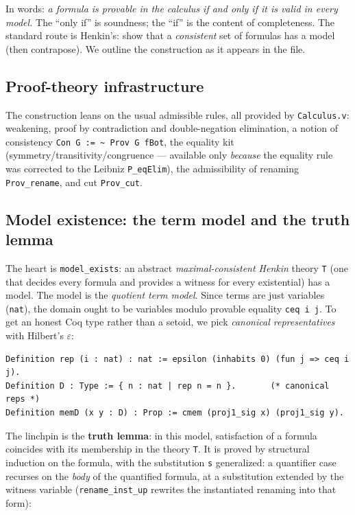 \documentclass[11pt]{article}
\theoremstyle{plain}
\theoremstyle{definition}
\newcommand{\cq}[1]{\lstinline[basicstyle=\ttfamily]|#1|}
\begin{document}
In words: \emph{a formula is provable in the calculus if and only if it is valid in
every model.} The ``only if'' is soundness; the ``if'' is the content of
completeness. The standard route is Henkin's: show that a \emph{consistent} set of
formulas has a model (then contrapose). We outline the construction as it appears
in the file.

\subsection{Proof-theory infrastructure}

The construction leans on the usual admissible rules, all provided by
\texttt{Calculus.v}: weakening, proof by contradiction and double-negation
elimination, a notion of
consistency \cq{Con G := ~ Prov G fBot}, the equality kit
(symmetry/transitivity/congruence --- available
only \emph{because} the equality rule was corrected to the Leibniz \cq{P_eqElim}),
the admissibility of renaming \cq{Prov_rename}, and cut \cq{Prov_cut}.

\subsection{Model existence: the term model and the truth lemma}

The heart is \cq{model_exists}: an abstract \emph{maximal-consistent Henkin}
theory \cq{T} (one that decides every formula and provides a witness for every
existential) has a model. The model is the \emph{quotient term model}. Since terms
are just variables (\cq{nat}), the domain ought to be variables modulo provable
equality \cq{ceq i j}. To get an honest Coq type rather than a setoid, we pick
\emph{canonical representatives} with Hilbert's $\varepsilon$:

\begin{lstlisting}
Definition rep (i : nat) : nat := epsilon (inhabits 0) (fun j => ceq i j).
Definition D : Type := { n : nat | rep n = n }.       (* canonical reps *)
Definition memD (x y : D) : Prop := cmem (proj1_sig x) (proj1_sig y).
\end{lstlisting}

The linchpin is the \textbf{truth lemma}: in this model, satisfaction of a formula
coincides with its membership in the theory \cq{T}. It is proved by structural
induction on the formula, with the substitution \cq{s} generalized: a quantifier
case recurses on the \emph{body} of the quantified formula, at a substitution
extended by the witness variable (\cq{rename_inst_up} rewrites the instantiated
renaming into that form):
\end{document}
